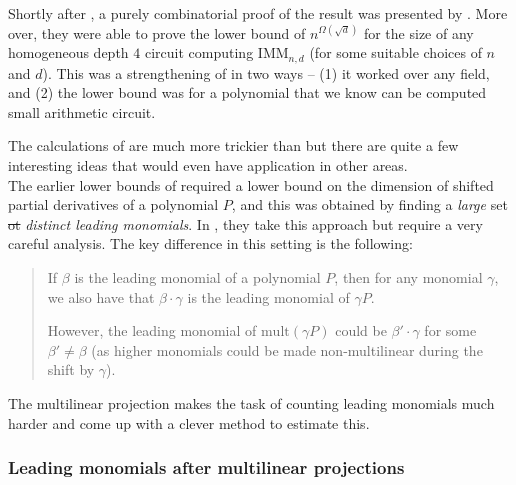 \documentclass{beatcs}
\newcommand{\IMM}{\mathrm{IMM}}
\providecommand{\DIFaddtex}[1]{{\protect\color{blue}\uwave{#1}}} %
\providecommand{\DIFdeltex}[1]{{\protect\color{red}\sout{#1}}}                      %
\providecommand{\DIFaddbegin}{} %
\providecommand{\DIFaddend}{} %
\providecommand{\DIFdelbegin}{} %
\providecommand{\DIFdelend}{} %
\providecommand{\DIFadd}[1]{\texorpdfstring{\DIFaddtex{#1}}{#1}} %
\providecommand{\DIFdel}[1]{\texorpdfstring{\DIFdeltex{#1}}{}} %
\begin{document}
Shortly after \cite{KLSS}, a purely combinatorial proof of the result was presented by \cite{KS14}. More over, they were able to prove the lower bound of $n^{\Omega(\sqrt{d})}$ for the size of any homogeneous depth $4$ circuit computing $\IMM_{n,d}$ (for some suitable choices of $n$ and $d$). This was a strengthening of \cite{KLSS} in two ways -- (1) it worked over any field, and (2) the lower bound was for a polynomial that we know can be computed small arithmetic circuit. 

The calculations of \cite{KS14} are much more trickier than \cite{KLSS} but there are quite a few interesting ideas that would even have application in other areas. \\

The earlier lower bounds of \cite{gkks13,KSS13,FLMS13} required a lower bound on the dimension of shifted partial derivatives of a polynomial $P$, and this was obtained by finding a \emph{large} set \DIFdelbegin \DIFdel{ot }\DIFdelend \DIFaddbegin \DIFadd{of }\DIFaddend \emph{distinct leading monomials}. In \cite{KS14}, they take this approach but require a very careful analysis. The key difference in this setting is the following: 

\begin{quote}
  If $\beta$ is the leading monomial of a polynomial $P$, then for any monomial $\gamma$, we also have that $\beta \cdot \gamma$ is the leading monomial of $\gamma P$. 

  However, the leading monomial of $\mathrm{mult}(\gamma P)$ could be $\beta' \cdot \gamma$ for some $\beta' \neq \beta$ (as higher monomials could be made non-multilinear during the shift by $\gamma$). 
\end{quote}

The multilinear projection makes the task of counting leading monomials much harder and \cite{KS14} come up with a clever method to estimate this. 

\subsubsection*{Leading monomials after multilinear projections}
\end{document}
